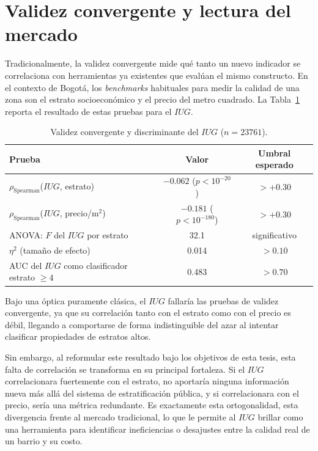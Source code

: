 \documentclass[12pt, a4paper, twoside, openright]{report}
\theoremstyle{plain}
\theoremstyle{definition}
\newcommand{\IUG}{IUG}             %
\begin{document}
\section{Validez convergente y lectura del mercado}\label{sec:convergente}

Tradicionalmente, la validez convergente mide qué tanto un nuevo indicador se correlaciona con herramientas ya existentes que evalúan el mismo constructo. En el contexto de Bogotá, los \emph{benchmarks} habituales para medir la calidad de una zona son el estrato socioeconómico y el precio del metro cuadrado. La Tabla~\ref{tab:convergente_validez} reporta el resultado de estas pruebas para el $\IUG$.

\begin{table}[htbp]
\centering
\caption{Validez convergente y discriminante del $\IUG$ ($n = \num{23761}$).}
\label{tab:convergente_validez}
\small
\begin{tabular}{@{}lcc@{}}
\toprule
\textbf{Prueba} & \textbf{Valor} & \textbf{Umbral esperado} \\
\midrule
$\rho_{\text{Spearman}}$($\IUG$, estrato) & $-0.062$ ($p < 10^{-20}$) & $> +0.30$ \\
$\rho_{\text{Spearman}}$($\IUG$, precio/m$^2$) & $-0.181$ ($p < 10^{-180}$) & $> +0.30$ \\
ANOVA: $F$ del $\IUG$ por estrato & 32.1 & significativo \\
$\eta^2$ (tamaño de efecto) & 0.014 & $> 0.10$ \\
AUC del $\IUG$ como clasificador estrato $\geq 4$ & 0.483 & $> 0.70$ \\
\bottomrule
\end{tabular}
\end{table}

Bajo una óptica puramente clásica, el $\IUG$ fallaría las pruebas de validez convergente, ya que su correlación tanto con el estrato como con el precio es débil, llegando a comportarse de forma indistinguible del azar al intentar clasificar propiedades de estratos altos. 

Sin embargo, al reformular este resultado bajo los objetivos de esta tesis, esta falta de correlación se transforma en su principal fortaleza. Si el $\IUG$ correlacionara fuertemente con el estrato, no aportaría ninguna información nueva más allá del sistema de estratificación pública, y si correlacionara con el precio, sería una métrica redundante. Es exactamente esta ortogonalidad, esta divergencia frente al mercado tradicional, lo que le permite al $\IUG$ brillar como una herramienta para identificar ineficiencias o desajustes entre la calidad real de un barrio y su costo.
\end{document}
